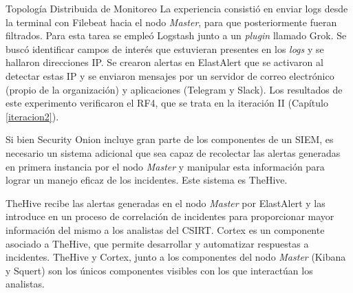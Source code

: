 \begin{subsection}{Topología Distribuida de Monitoreo}
    La experiencia consistió en enviar logs desde la terminal con Filebeat hacia el nodo \textit{Master}, para que posteriormente fueran filtrados. Para esta tarea se empleó Logstash junto a un \textit{plugin} llamado Grok. Se buscó identificar campos de interés que estuvieran presentes en los \textit{logs} y se hallaron direcciones IP. Se crearon alertas en ElastAlert que se activaron al detectar estas IP y se enviaron mensajes por un servidor de correo electrónico (propio de la organización) y aplicaciones (Telegram y Slack). Los resultados de este experimento verificaron el RF4, que se trata en la iteración II (Capítulo \ref{iteracion2}). \par
    Si bien Security Onion incluye gran parte de los componentes de un SIEM, es necesario un sistema adicional que sea capaz de recolectar las alertas generadas en primera instancia por el nodo \textit{Master} y manipular esta información para lograr un manejo eficaz de los incidentes. Este sistema es TheHive. \par
    TheHive recibe las alertas generadas en el nodo \textit{Master} por ElastAlert y las introduce en un proceso de correlación de incidentes para proporcionar mayor información del mismo a los analistas del CSIRT. Cortex es un componente asociado a TheHive, que permite desarrollar y automatizar respuestas a incidentes. TheHive y Cortex, junto a los componentes del nodo \textit{Master} (Kibana y Squert) son los únicos componentes visibles con los que interactúan los analistas. \par
    

\end{subsection}
